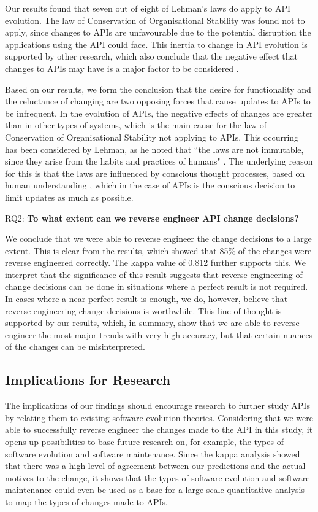 \documentclass{sig-alternate}
\begin{document}
Our results found that seven out of eight of Lehman's laws do apply to API evolution. The law of Conservation of Organisational Stability was found not to apply, since changes to APIs are unfavourable due to the potential disruption the applications using the API could face. This inertia to change in API evolution is supported by other research, which also conclude that the negative effect that changes to APIs may have is a major factor to be considered \cite{google_talk, henning2007api, mcdonnell2013empirical, robbes2012developers}. 

Based on our results, we form the conclusion that the desire for functionality and the reluctance of changing are two opposing forces that cause updates to APIs to be infrequent. In the evolution of APIs, the negative effects of changes are greater than in other types of systems, which is the main cause for the law of Conservation of Organisational Stability not applying to APIs. This occurring has been considered by Lehman, as he noted that ``the laws are not immutable, since they arise from the habits and practices of humans" \cite{lehman1980programs}. The underlying reason for this is that the laws are influenced by conscious thought processes, based on human understanding \cite{lehman1980understanding}, which in the case of APIs is the conscious decision to limit updates as much as possible. 

\smallskip
\noindent
RQ2: \textbf{To what extent can we reverse engineer API change decisions?}
\smallskip

We conclude that we were able to reverse engineer the change decisions to a large extent. This is clear from the results, which showed that 85\% of the changes were reverse engineered correctly. The kappa value of 0.812 further supports this. We interpret that the significance of this result suggests that reverse engineering of change decisions can be done in situations where a perfect result is not required. In cases where a near-perfect result is enough, we do, however, believe that reverse engineering change decisions is worthwhile. This line of thought is supported by our results, which, in summary, show that we are able to reverse engineer the most major trends with very high accuracy, but that certain nuances of the changes can be misinterpreted. 



\subsection{Implications for Research} 
The implications of our findings should encourage research to further study APIs by relating them to existing software evolution theories. Considering that we were able to successfully reverse engineer the changes made to the API in this study, it opens up possibilities to base future research on, for example, the types of software evolution and software maintenance. Since the kappa analysis showed that there was a high level of agreement between our predictions and the actual motives to the change, it shows that the types of software evolution and software maintenance could even be used as a base for a large-scale quantitative analysis to map the types of changes made to APIs. 
\end{document}
